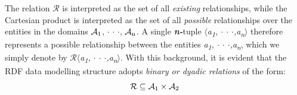 The relation $\mathcal{R}$ is interpreted as the set of all \textit{existing} relationships, while the Cartesian product is interpreted as the set of all \textit{possible} relationships over the entities in the domains $\mathcal{A\textsubscript{1}}$, $\cdot$ $\cdot$ $\cdot$, $\mathcal{A\textsubscript{n}}$. A single \textbf{\textit{n-}}tuple $\langle$\textit{a\textsubscript{1}, $\cdot$ $\cdot$ $\cdot$,a\textsubscript{n}}$\rangle$ therefore represents a possible relationship between the entities \textit{a\textsubscript{1}, $\cdot$ $\cdot$ $\cdot$,a\textsubscript{n}}, which we simply denote by   $\mathcal{R}$$\langle$\textit{a\textsubscript{1}, $\cdot$ $\cdot$ $\cdot$,a\textsubscript{n}}$\rangle$. With this background, it is evident that the RDF data modelling structure adopts \textit{binary or dyadic relations} of the form:
\begin{equation}
    \mathcal{R} \subseteq \mathcal{A\textsubscript{1}} \times \mathcal{A\textsubscript{2}}
\end{equation}
$$
